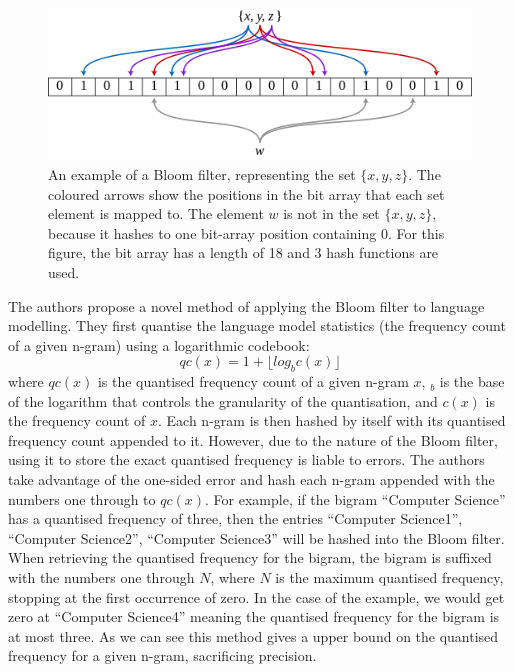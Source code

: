 \documentclass[sigconf, nonacm=true]{acmart}
\begin{document}
\begin{figure}
    \centering
    \includegraphics[width=\linewidth]{figures/Bloom_filter.png}
    \caption{An example of a Bloom filter, representing the set $\{x, y, z\}$. The coloured arrows show the positions in the bit array that each set element is mapped to. The element $w$ is not in the set $\{x, y, z\}$, because it hashes to one bit-array position containing 0. For this figure, the bit array has a length of 18 and 3 hash functions are used.\protect\footnotemark}
    \label{fig:bloom_filter}
\end{figure}


The authors propose a novel method of applying the Bloom filter to language modelling. They first quantise the language model statistics (the frequency count of a given n-gram) using a logarithmic codebook:
$$ qc(x) = 1 + \lfloor log_b c(x) \rfloor $$
where $qc(x)$ is the quantised frequency count of a given n-gram $x$, $_b$ is the base of the logarithm that controls the granularity of the quantisation, and $c(x)$ is the frequency count of $x$. Each n-gram is then hashed by itself with its quantised frequency count appended to it. However, due to the nature of the Bloom filter, using it to store the exact quantised frequency is liable to errors. The authors take advantage of the one-sided error and hash each n-gram appended with the numbers one through to $qc(x)$. For example, if the bigram ``Computer Science'' has a quantised frequency of three, then the entries ``Computer Science1'', ``Computer Science2'', ``Computer Science3'' will be hashed into the Bloom filter. When retrieving the quantised frequency for the bigram, the bigram is suffixed with the numbers one through $N$, where $N$ is the maximum quantised frequency, stopping at the first occurrence of zero. In the case of the example, we would get zero at ``Computer Science4'' meaning the quantised frequency for the bigram is at most three. As we can see this method gives a upper bound on the quantised frequency for a given n-gram, sacrificing precision.
\end{document}
